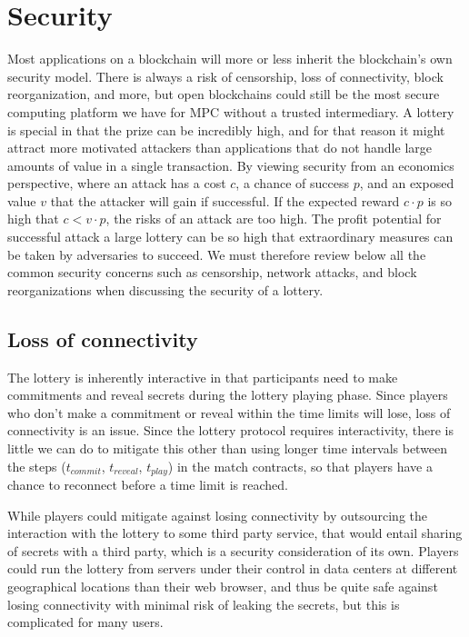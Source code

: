 \section{Security}
\label{sec:security}

Most applications on a blockchain will more or less inherit the blockchain's own security model. There is always a risk of censorship, loss of connectivity, block reorganization, and more, but open blockchains could still be the most secure computing platform we have for MPC without a trusted intermediary. A lottery is special in that the prize can be incredibly high, and for that reason it might attract more motivated attackers than applications that do not handle large amounts of value in a single transaction. By viewing security from an economics perspective, where an attack has a cost $c$, a chance of success $p$, and an exposed value $v$ that the attacker will gain if successful. If the expected reward $c \cdot p$ is so high that $c < v \cdot p$, the risks of an attack are too high. The profit potential for successful attack a large lottery can be so high that extraordinary measures can be taken by adversaries to succeed. We must therefore review below all the common security concerns such as censorship, network attacks, and block reorganizations when discussing the security of a lottery. 

\subsection{Loss of connectivity}
The lottery is inherently interactive in that participants need to make commitments and reveal secrets during the lottery playing phase. Since players who don't make a commitment or reveal within the time limits will lose, loss of connectivity is an issue. Since the lottery protocol requires interactivity, there is little we can do to mitigate this other than using longer time intervals between the steps ($t_{commit}$, $t_{reveal}$, $t_{play}$) in the match contracts, so that players have a chance to reconnect before a time limit is reached.

While players could mitigate against losing connectivity by outsourcing the interaction with the lottery to some third party service, that would entail sharing of secrets with a third party, which is a security consideration of its own. Players could run the lottery from servers under their control in data centers at different geographical locations than their web browser, and thus be quite safe against losing connectivity with minimal risk of leaking the secrets, but this is complicated for many users. 

